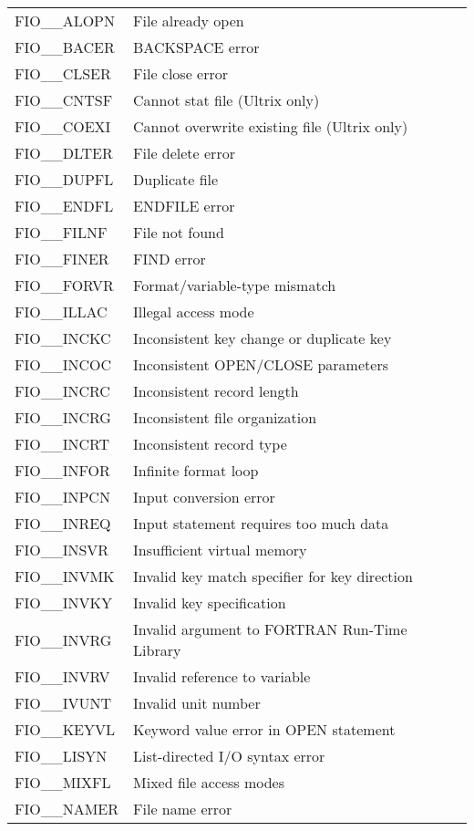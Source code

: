 \documentclass[twoside,11pt,nolof]{starlink}
\begin{document}
\begin{tabular}{ll}
FIO\_\_ALOPN & File already open \\
FIO\_\_BACER & BACKSPACE error \\
FIO\_\_CLSER & File close error \\
FIO\_\_CNTSF & Cannot stat file (Ultrix only) \\
FIO\_\_COEXI & Cannot overwrite existing file (Ultrix only) \\
FIO\_\_DLTER & File delete error \\
FIO\_\_DUPFL & Duplicate file \\
FIO\_\_ENDFL & ENDFILE error \\
FIO\_\_FILNF & File not found \\
FIO\_\_FINER & FIND error \\
FIO\_\_FORVR & Format/variable-type mismatch \\
FIO\_\_ILLAC \footnotemark[1] & Illegal access mode \\
FIO\_\_INCKC & Inconsistent key change or duplicate key \\
FIO\_\_INCOC & Inconsistent OPEN/CLOSE parameters \\
FIO\_\_INCRC & Inconsistent record length \\
FIO\_\_INCRG & Inconsistent file organization \\
FIO\_\_INCRT & Inconsistent record type \\
FIO\_\_INFOR & Infinite format loop \\
FIO\_\_INPCN & Input conversion error \\
FIO\_\_INREQ & Input statement requires too much data \\
FIO\_\_INSVR & Insufficient virtual memory \\
FIO\_\_INVMK & Invalid key match specifier for key direction \\
FIO\_\_INVKY & Invalid key specification \\
FIO\_\_INVRG & Invalid argument to FORTRAN Run-Time Library \\
FIO\_\_INVRV & Invalid reference to variable \\
FIO\_\_IVUNT \footnotemark[1] & Invalid unit number \\
FIO\_\_KEYVL & Keyword value error in OPEN statement \\
FIO\_\_LISYN & List-directed I/O syntax error \\
FIO\_\_MIXFL & Mixed file access modes \\
FIO\_\_NAMER & File name error \\

\end{tabular}
\end{document}
